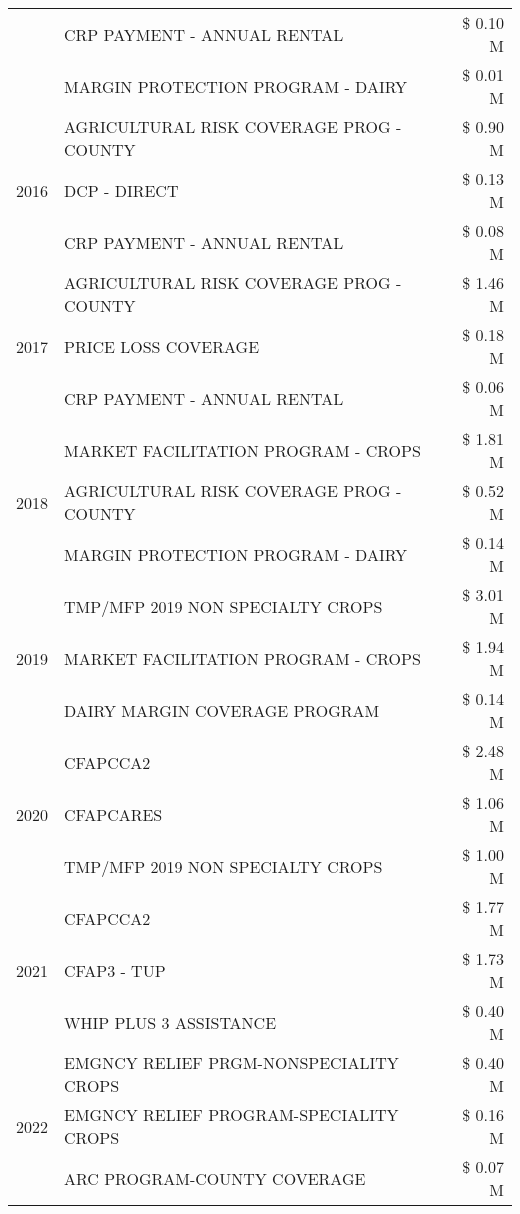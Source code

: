 \begin{tabular}{llr}
 & CRP PAYMENT - ANNUAL RENTAL & \$ 0.10 M \\
 & MARGIN PROTECTION PROGRAM - DAIRY & \$ 0.01 M \\
\cline{1-3}
\multirow[t]{3}{*}{2016} & AGRICULTURAL RISK COVERAGE PROG - COUNTY & \$ 0.90 M \\
 & DCP - DIRECT & \$ 0.13 M \\
 & CRP PAYMENT - ANNUAL RENTAL & \$ 0.08 M \\
\cline{1-3}
\multirow[t]{3}{*}{2017} & AGRICULTURAL RISK COVERAGE PROG - COUNTY & \$ 1.46 M \\
 & PRICE LOSS COVERAGE & \$ 0.18 M \\
 & CRP PAYMENT - ANNUAL RENTAL & \$ 0.06 M \\
\cline{1-3}
\multirow[t]{3}{*}{2018} & MARKET FACILITATION PROGRAM - CROPS & \$ 1.81 M \\
 & AGRICULTURAL RISK COVERAGE PROG - COUNTY & \$ 0.52 M \\
 & MARGIN PROTECTION PROGRAM - DAIRY & \$ 0.14 M \\
\cline{1-3}
\multirow[t]{3}{*}{2019} & TMP/MFP 2019 NON SPECIALTY CROPS & \$ 3.01 M \\
 & MARKET FACILITATION PROGRAM - CROPS & \$ 1.94 M \\
 & DAIRY MARGIN COVERAGE PROGRAM & \$ 0.14 M \\
\cline{1-3}
\multirow[t]{3}{*}{2020} & CFAPCCA2 & \$ 2.48 M \\
 & CFAPCARES & \$ 1.06 M \\
 & TMP/MFP 2019 NON SPECIALTY CROPS & \$ 1.00 M \\
\cline{1-3}
\multirow[t]{3}{*}{2021} & CFAPCCA2 & \$ 1.77 M \\
 & CFAP3 - TUP & \$ 1.73 M \\
 & WHIP PLUS 3 ASSISTANCE & \$ 0.40 M \\
\cline{1-3}
\multirow[t]{3}{*}{2022} & EMGNCY RELIEF PRGM-NONSPECIALITY CROPS & \$ 0.40 M \\
 & EMGNCY RELIEF PROGRAM-SPECIALITY CROPS & \$ 0.16 M \\
 & ARC PROGRAM-COUNTY COVERAGE & \$ 0.07 M \\
\cline{1-3}
\bottomrule
\end{tabular}
